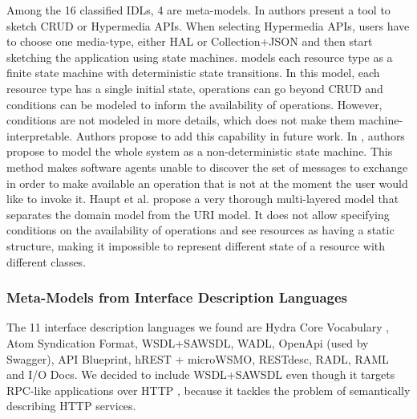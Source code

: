 Among the 16 classified IDLs, 4 are meta-models. In \cite{Rapido} authors present a tool to sketch CRUD or Hypermedia APIs. When selecting Hypermedia APIs, users have to choose one media-type, either HAL or Collection+JSON and then start sketching the application using state machines. \cite{Schreier:2011:MRA:1967428.1967434} models each resource type as a finite state machine with deterministic state transitions. In this model, each resource type has a single initial state, operations can go beyond CRUD and conditions can be modeled to inform the availability of operations. However, conditions are not modeled in more details, which does not make them machine-interpretable. Authors propose to add this capability in future work. In \cite{10.1007/978-3-642-22233-7_24}, authors propose to model the whole system as a non-deterministic state machine. This method makes software agents unable to discover the set of messages to exchange in order to make available an operation that is not at the moment the user would like to invoke it. Haupt et al. \cite{10.1109/ICWS.2014.30} propose a very thorough multi-layered model that separates the domain model from the URI model. It does not allow specifying conditions on the availability of operations and see resources as having a static structure, making it impossible to represent different state of a resource with different classes. 

\subsubsection{Meta-Models from Interface Description Languages}

The 11 interface description languages we found are Hydra Core Vocabulary \cite{Lanthaler:2013:CGW:2487788.2487799}, Atom Syndication Format\cite{AtomSF}, WSDL+SAWSDL, WADL, OpenApi (used by Swagger), API Blueprint, hREST + microWSMO, RESTdesc, RADL, RAML and I/O Docs. We decided to include WSDL+SAWSDL even though it targets RPC-like applications over HTTP \cite{john2012framework}, because it tackles the problem of semantically describing HTTP services.

